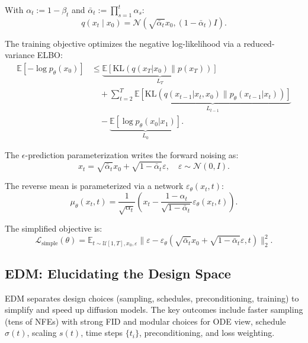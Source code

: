 With $\alpha_t := 1-\beta_t$ and $\bar{\alpha}_t := \prod_{s=1}^t \alpha_s$:
\begin{equation}
q(x_t \mid x_0) = \mathcal{N}(\sqrt{\bar{\alpha}_t} x_0, (1-\bar{\alpha}_t)I).
\end{equation}

The training objective optimizes the negative log-likelihood via a reduced-variance ELBO:
\begin{align}
\mathbb{E}[-\log p_\theta(x_0)] &\leq \underbrace{\mathbb{E}[\text{KL}(q(x_T|x_0) \| p(x_T))]}_{L_T} \nonumber \\
&\quad + \sum_{t=2}^{T} \underbrace{\mathbb{E}[\text{KL}(q(x_{t-1}|x_t,x_0) \| p_\theta(x_{t-1}|x_t))]}_{L_{t-1}} \nonumber \\
&\quad - \underbrace{\mathbb{E}[\log p_\theta(x_0|x_1)]}_{L_0}.
\end{align}

The $\epsilon$-prediction parameterization writes the forward noising as:
\begin{equation}
x_t = \sqrt{\bar{\alpha}_t} x_0 + \sqrt{1-\bar{\alpha}_t} \varepsilon, \quad \varepsilon \sim \mathcal{N}(0,I).
\end{equation}

The reverse mean is parameterized via a network $\varepsilon_\theta(x_t,t)$:
\begin{equation}
\mu_\theta(x_t,t) = \frac{1}{\sqrt{\alpha_t}} \left(x_t - \frac{1-\alpha_t}{\sqrt{1-\bar{\alpha}_t}} \varepsilon_\theta(x_t,t)\right).
\end{equation}

The simplified objective is:
\begin{equation}
\mathcal{L}_{\text{simple}}(\theta) = \mathbb{E}_{t \sim \mathcal{U}[1,T], x_0, \varepsilon} \|\varepsilon - \varepsilon_\theta(\sqrt{\bar{\alpha}_t} x_0 + \sqrt{1-\bar{\alpha}_t} \varepsilon, t)\|_2^2.
\end{equation}

\subsection{EDM: Elucidating the Design Space}

EDM separates design choices (sampling, schedules, preconditioning, training) to simplify and speed up diffusion models. The key outcomes include faster sampling (tens of NFEs) with strong FID and modular choices for ODE view, schedule $\sigma(t)$, scaling $s(t)$, time steps $\{t_i\}$, preconditioning, and loss weighting.

